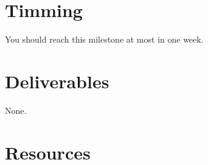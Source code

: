 \section{Timming}

You should reach this milestone at most in one week.

\section{Deliverables}

None.

\section{Resources}


